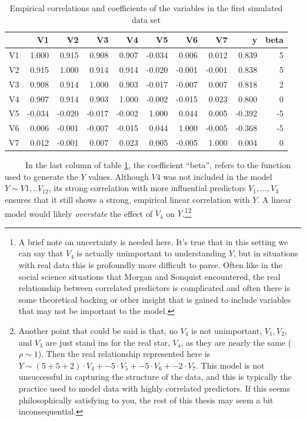 \documentclass[12pt,twoside]{reedthesis}
\begin{document}
  \begin{table}
  
  \caption{\label{tab:unnamed-chunk-12}\label{tab:tabcorSim1}Empirical correlations and coefficients of the variables in the first simulated data set}
  \centering
  \begin{tabular}[t]{l|r|r|r|r|r|r|r|r|r}
  \hline
    & V1 & V2 & V3 & V4 & V5 & V6 & V7 & y & beta\\
  \hline
  V1 & 1.000 & 0.915 & 0.908 & 0.907 & -0.034 & 0.006 & 0.012 & 0.839 & 5\\
  \hline
  V2 & 0.915 & 1.000 & 0.914 & 0.914 & -0.020 & -0.001 & -0.001 & 0.838 & 5\\
  \hline
  V3 & 0.908 & 0.914 & 1.000 & 0.903 & -0.017 & -0.007 & 0.007 & 0.818 & 2\\
  \hline
  V4 & 0.907 & 0.914 & 0.903 & 1.000 & -0.002 & -0.015 & 0.023 & 0.800 & 0\\
  \hline
  V5 & -0.034 & -0.020 & -0.017 & -0.002 & 1.000 & 0.044 & 0.005 & -0.392 & -5\\
  \hline
  V6 & 0.006 & -0.001 & -0.007 & -0.015 & 0.044 & 1.000 & -0.005 & -0.368 & -5\\
  \hline
  V7 & 0.012 & -0.001 & 0.007 & 0.023 & 0.005 & -0.005 & 1.000 & 0.004 & 0\\
  \hline
  \end{tabular}
  \end{table}
  
  ~~~~~In the last column of table \ref{tab:tabcorSim1}, the coefficient
  ``beta'', refers to the function used to generate the \(Y\) values.
  Although \(V4\) was not included in the model \(Y \sim V1,..V_{12}\),
  its strong correlation with more influential predictors \(V_1,...,V_3\)
  ensures that it still shows a strong, empirical linear correlation with
  \(Y\). A linear model would likely \emph{overstate} the effect of
  \(V_4\) on \(Y\).\footnote{A brief note on uncertainty is needed here.
    It's true that in this setting we can say that \(V_4\) is actually
    unimportant to understanding \(Y\), but in situations with real data
    this is profoundly more difficult to parse. Often like in the social
    science situations that Morgan and Sonquist encountered, the real
    relationship between correlated predictors is complicated and often
    there is some theoretical backing or other insight that is gained to
    include variables that may not be important to the model.}\footnote{Another
    point that could be said is that, no \(V_4\) is not unimportant,
    \(V_1, V_2,\) and \(V_3\) are just stand ins for the real star,
    \(V_4\), as they are nearly the same (\(\rho \sim 1\)). Then the real
    relationship represented here is
    \(Y \sim (5 + 5 + 2) \cdot V_4 + -5 \cdot V_5 + -5 \cdot V_6 + -2 \cdot V_7\).
    This model is not unsuccessful in capturing the structure of the data,
    and this is typically the practice used to model data with highly
    correlated predictors. If this seems philosophically satisfying to
    you, the rest of this thesis may seem a bit inconsequential.}
  
\end{document}
